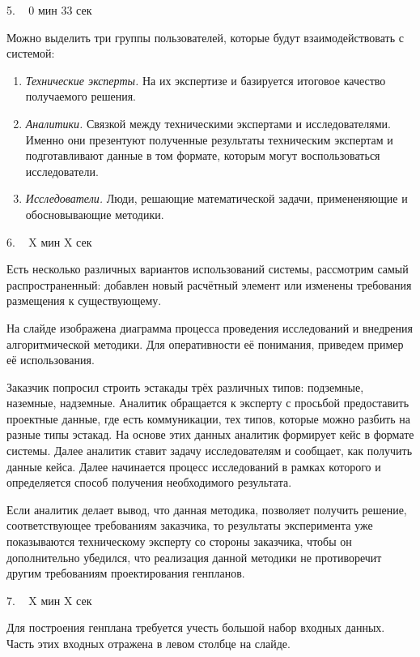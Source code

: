 \documentclass[a4paper,14pt]{extarticle}
\begin{document}
    5. ~ 0 мин 33 сек

    Можно выделить три группы пользователей, которые будут взаимодействовать с системой:
    \begin{enumerate}
        \item {
            \textit{Технические эксперты.} На их экспертизе и базируется итоговое
            качество получаемого решения.
        }
        \item{
            \textit{Аналитики.} Связкой между техническими экспертами и исследователями.
            Именно они презентуют полученные результаты техническим экспертам и подготавливают данные в том формате,
            которым могут воспользоваться исследователи.
        }
        \item{
            \textit{Исследователи.} Люди, решающие математической задачи,
            примененяющие и обосновывающие методики.
        }
    \end{enumerate}

    6. ~ X мин X сек

    Есть несколько различных вариантов использований системы, рассмотрим самый распространенный:
    добавлен новый расчётный элемент или изменены требования размещения к существующему.

    На слайде изображена диаграмма процесса проведения исследований и
    внедрения алгоритмической методики. Для оперативности её понимания,
    приведем пример её использования.

    Заказчик попросил строить эстакады трёх различных типов: подземные, наземные, надземные.
    Аналитик обращается к эксперту с просьбой предоставить проектные данные, где есть коммуникации,
    тех типов, которые можно разбить на разные типы эстакад.
    На основе этих данных аналитик формирует кейс в формате системы.
    Далее аналитик ставит задачу исследователям и сообщает, как получить данные кейса.
    Далее начинается процесс исследований в рамках которого и определяется способ получения необходимого результата.

    Если аналитик делает вывод, что данная методика, позволяет получить решение, соответствующее требованиям
    заказчика, то результаты эксперимента уже показываются техническому эксперту со стороны заказчика,
    чтобы он дополнительно убедился, что реализация данной методики не противоречит другим требованиям
    проектирования генпланов.

    7. ~ X мин X сек

    Для построения генплана требуется учесть большой набор входных данных.
    Часть этих входных отражена в левом столбце на слайде.
\end{document}
